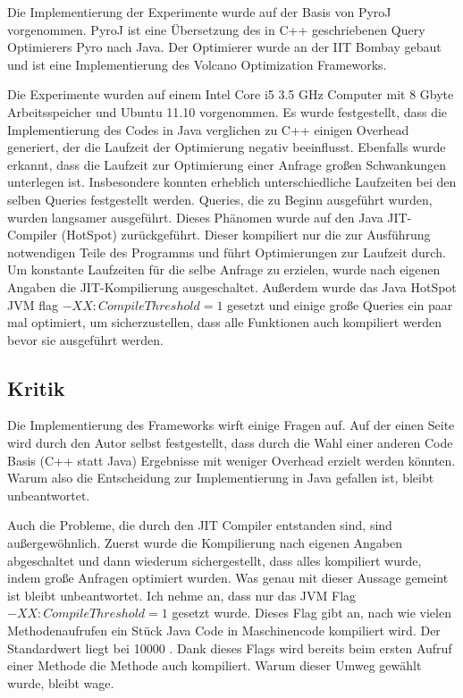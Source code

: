 Die Implementierung der Experimente wurde auf der Basis von PyroJ vorgenommen. PyroJ ist eine Übersetzung des in C++ geschriebenen Query Optimierers Pyro nach Java. Der Optimierer wurde an der IIT Bombay gebaut und ist eine Implementierung des Volcano Optimization Frameworks.

Die Experimente wurden auf einem Intel Core i5 3.5 GHz Computer mit 8 Gbyte Arbeitsspeicher und Ubuntu 11.10 vorgenommen. Es wurde festgestellt, dass die Implementierung des Codes in Java verglichen zu C++ einigen Overhead generiert, der die Laufzeit der Optimierung negativ beeinflusst. Ebenfalls wurde erkannt, dass die Laufzeit zur Optimierung einer Anfrage großen Schwankungen unterlegen ist. Insbesondere konnten erheblich unterschiedliche Laufzeiten bei den selben Queries festgestellt werden. Queries, die zu Beginn ausgeführt wurden, wurden langsamer ausgeführt. Dieses Phänomen wurde auf den Java JIT-Compiler (HotSpot) zurückgeführt. Dieser kompiliert nur die zur Ausführung notwendigen Teile des Programms und führt Optimierungen zur Laufzeit durch. Um konstante Laufzeiten für die selbe Anfrage zu erzielen, wurde nach eigenen Angaben die JIT-Kompilierung ausgeschaltet. Außerdem wurde das Java HotSpot JVM flag $-XX:CompileThreshold=1$ gesetzt und einige große Queries ein paar mal optimiert, um sicherzustellen, dass alle Funktionen auch kompiliert werden bevor sie ausgeführt werden.
 

\subsection{Kritik} 


Die Implementierung des Frameworks wirft einige Fragen auf. Auf der einen Seite wird durch den Autor selbst festgestellt, dass durch die Wahl einer anderen Code Basis (C++ statt Java) Ergebnisse mit weniger Overhead erzielt werden könnten. Warum also die Entscheidung zur Implementierung in Java gefallen ist, bleibt unbeantwortet.

Auch die Probleme, die durch den JIT Compiler entstanden sind, sind außergewöhnlich. Zuerst wurde die Kompilierung nach eigenen Angaben abgeschaltet und dann wiederum sichergestellt, dass alles kompiliert wurde, indem große Anfragen optimiert wurden. Was genau mit dieser Aussage gemeint ist bleibt unbeantwortet.  Ich nehme an, dass nur das JVM Flag $-XX:CompileThreshold=1$ gesetzt wurde. Dieses Flag gibt an, nach wie vielen Methodenaufrufen ein Stück Java Code in Maschinencode kompiliert wird. Der Standardwert liegt bei 10000 \cite{oracle2015VMOptions}. Dank dieses Flags wird bereits beim ersten Aufruf einer Methode die Methode auch kompiliert. Warum dieser Umweg gewählt wurde, bleibt wage.

